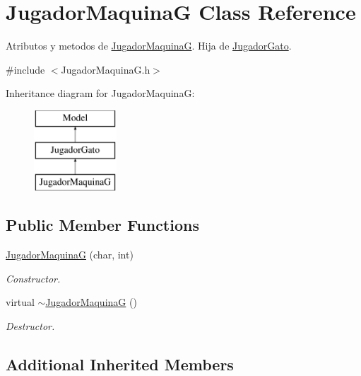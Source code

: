 \hypertarget{class_jugador_maquina_g}{}\section{Jugador\+MaquinaG Class Reference}
\label{class_jugador_maquina_g}


Atributos y metodos de \hyperlink{class_jugador_maquina_g}{Jugador\+MaquinaG}. Hija de \hyperlink{class_jugador_gato}{Jugador\+Gato}.  




{\ttfamily \#include $<$Jugador\+Maquina\+G.\+h$>$}

Inheritance diagram for Jugador\+MaquinaG\+:\begin{figure}[H]
\begin{center}
\leavevmode
\includegraphics[height=3.000000cm]{class_jugador_maquina_g}
\end{center}
\end{figure}
\subsection*{Public Member Functions}
\begin{DoxyCompactItemize}
\item 
\hyperlink{class_jugador_maquina_g_aa76e12483ff12147f0adce95c9c6143f}{Jugador\+MaquinaG} (char, int)
\begin{DoxyCompactList}\small\item\em Constructor. \end{DoxyCompactList}\item 
virtual \hyperlink{class_jugador_maquina_g_ae60c6b2bfb8397cf05af73326bf7fa8f}{$\sim$\+Jugador\+MaquinaG} ()\hypertarget{class_jugador_maquina_g_ae60c6b2bfb8397cf05af73326bf7fa8f}{}\label{class_jugador_maquina_g_ae60c6b2bfb8397cf05af73326bf7fa8f}

\begin{DoxyCompactList}\small\item\em Destructor. \end{DoxyCompactList}\end{DoxyCompactItemize}
\subsection*{Additional Inherited Members}


